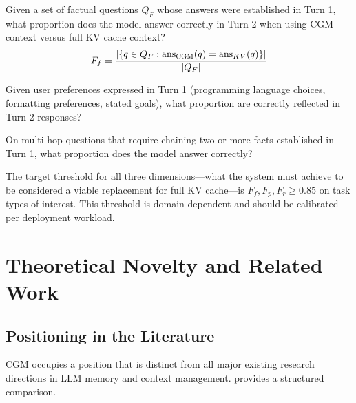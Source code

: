 \documentclass[11pt, a4paper, twoside]{article}
\theoremstyle{definition}
\newcommand{\CGM}{\textsc{CGM}\xspace}
\begin{document}
\begin{description}[leftmargin=*, style=nextline]
  \item[Factual fidelity $F_f$:] Given a set of factual questions $Q_F$ whose
    answers were established in Turn 1, what proportion does the model answer
    correctly in Turn 2 when using \CGM context versus full KV cache context?
    \[F_f = \frac{|\{q \in Q_F : \text{ans}_{\CGM}(q) = \text{ans}_{KV}(q)\}|}{|Q_F|}\]
  \item[Preference fidelity $F_p$:] Given user preferences expressed in Turn 1
    (programming language choices, formatting preferences, stated goals), what
    proportion are correctly reflected in Turn 2 responses?
  \item[Reasoning fidelity $F_r$:] On multi-hop questions that require chaining
    two or more facts established in Turn 1, what proportion does the model answer
    correctly?
\end{description}

The target threshold for all three dimensions---what the system must achieve to
be considered a viable replacement for full KV cache---is $F_f, F_p, F_r \geq 0.85$
on task types of interest. This threshold is domain-dependent and should be
calibrated per deployment workload.

\section{Theoretical Novelty and Related Work}
\label{sec:novelty}

\subsection{Positioning in the Literature}

\CGM occupies a position that is distinct from all major existing research directions
in LLM memory and context management.  provides a structured
comparison.
\end{document}
